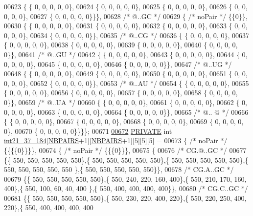 \begin{DoxyCode}
00623 \{ \{  0, 0, 0, 0, 0\},
00624 \{  0, 0, 0, 0, 0\},
00625 \{  0, 0, 0, 0, 0\},
00626 \{  0, 0, 0, 0, 0\},
00627 \{  0, 0, 0, 0, 0\}\}\},
00628  \textcolor{comment}{/*  @..GC */}
00629 \{ \textcolor{comment}{/* noPair */} \{\{0\}\},
00630 \{ \{  0, 0, 0, 0, 0\},
00631 \{  0, 0, 0, 0, 0\},
00632 \{  0, 0, 0, 0, 0\},
00633 \{  0, 0, 0, 0, 0\},
00634 \{  0, 0, 0, 0, 0\}\},
00635  \textcolor{comment}{/*  @..CG */}
00636 \{ \{  0, 0, 0, 0, 0\},
00637 \{  0, 0, 0, 0, 0\},
00638 \{  0, 0, 0, 0, 0\},
00639 \{  0, 0, 0, 0, 0\},
00640 \{  0, 0, 0, 0, 0\}\},
00641  \textcolor{comment}{/*  @..GU */}
00642 \{ \{  0, 0, 0, 0, 0\},
00643 \{  0, 0, 0, 0, 0\},
00644 \{  0, 0, 0, 0, 0\},
00645 \{  0, 0, 0, 0, 0\},
00646 \{  0, 0, 0, 0, 0\}\},
00647  \textcolor{comment}{/*  @..UG */}
00648 \{ \{  0, 0, 0, 0, 0\},
00649 \{  0, 0, 0, 0, 0\},
00650 \{  0, 0, 0, 0, 0\},
00651 \{  0, 0, 0, 0, 0\},
00652 \{  0, 0, 0, 0, 0\}\},
00653  \textcolor{comment}{/*  @..AU */}
00654 \{ \{  0, 0, 0, 0, 0\},
00655 \{  0, 0, 0, 0, 0\},
00656 \{  0, 0, 0, 0, 0\},
00657 \{  0, 0, 0, 0, 0\},
00658 \{  0, 0, 0, 0, 0\}\},
00659  \textcolor{comment}{/*  @..UA */}
00660 \{ \{  0, 0, 0, 0, 0\},
00661 \{  0, 0, 0, 0, 0\},
00662 \{  0, 0, 0, 0, 0\},
00663 \{  0, 0, 0, 0, 0\},
00664 \{  0, 0, 0, 0, 0\}\},
00665  \textcolor{comment}{/*  @.. @ */}
00666 \{ \{  0, 0, 0, 0, 0\},
00667 \{  0, 0, 0, 0, 0\},
00668 \{  0, 0, 0, 0, 0\},
00669 \{  0, 0, 0, 0, 0\},
00670 \{  0, 0, 0, 0, 0\}\}\}\};
00671 
\mbox{\hyperlink{1_88_84__intloops_8h_a521ad3fdbaaac7fcb0dc23b98ea70fdf}{00672}} \mbox{\hyperlink{edit__cost_8h_a5e151c615eda34903514212f05a5ccf8}{PRIVATE}} \textcolor{keywordtype}{int} \mbox{\hyperlink{1_88_84__intloops_8h_a521ad3fdbaaac7fcb0dc23b98ea70fdf}{int21\_37\_184}}[\mbox{\hyperlink{1_88_84__epars_8h_a5e75221c779d618eab81e096f37e32ce}{NBPAIRS}}+1][\mbox{\hyperlink{1_88_84__epars_8h_a5e75221c779d618eab81e096f37e32ce}{NBPAIRS}}+1][5][5][5] =
00673 \{ \textcolor{comment}{/* noPair */} \{\{\{\{0\}\}\}\},
00674 \{ \textcolor{comment}{/* noPair */} \{\{\{0\}\}\},
00675 \{
00676 \textcolor{comment}{/* CG.@..GC */}
00677 \{\{ 550, 550, 550, 550, 550\},\{ 550, 550, 550, 550, 550\},\{ 550, 550, 550, 550, 550\},\{ 550, 550, 550, 550, 550
      \},\{ 550, 550, 550, 550, 550\}\},
00678 \textcolor{comment}{/* CG.A..GC */}
00679 \{\{ 550, 550, 550, 550, 550\},\{ 550, 240, 220, 160, 400\},\{ 550, 210, 170, 160, 400\},\{ 550, 100,  60,  40, 400
      \},\{ 550, 400, 400, 400, 400\}\},
00680 \textcolor{comment}{/* CG.C..GC */}
00681 \{\{ 550, 550, 550, 550, 550\},\{ 550, 230, 220, 400, 220\},\{ 550, 220, 250, 400, 220\},\{ 550, 400, 400, 400, 400

\end{DoxyCode}
